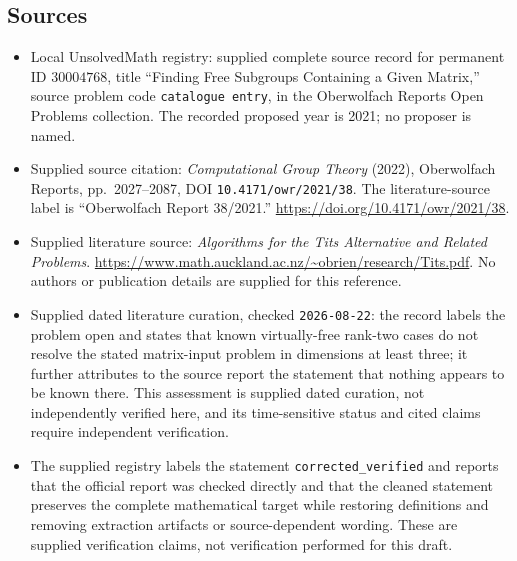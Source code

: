 \documentclass[11pt]{article}
\begin{document}
\subsection{Sources}
\begin{itemize}
\item Local UnsolvedMath registry: supplied complete source record for permanent ID \(30004768\), title ``Finding Free Subgroups Containing a Given Matrix,'' source problem code \texttt{catalogue entry}, in the Oberwolfach Reports Open Problems collection. The recorded proposed year is 2021; no proposer is named.
\item Supplied source citation: \emph{Computational Group Theory} (2022), Oberwolfach Reports, pp.\ 2027--2087, DOI \texttt{10.4171/owr/2021/38}. The literature-source label is ``Oberwolfach Report 38/2021.'' \url{https://doi.org/10.4171/owr/2021/38}.
\item Supplied literature source: \emph{Algorithms for the Tits Alternative and Related Problems}. \url{https://www.math.auckland.ac.nz/~obrien/research/Tits.pdf}. No authors or publication details are supplied for this reference.
\item Supplied dated literature curation, checked \texttt{2026-08-22}: the record labels the problem open and states that known virtually-free rank-two cases do not resolve the stated matrix-input problem in dimensions at least three; it further attributes to the source report the statement that nothing appears to be known there. This assessment is supplied dated curation, not independently verified here, and its time-sensitive status and cited claims require independent verification.
\item The supplied registry labels the statement \texttt{corrected\_verified} and reports that the official report was checked directly and that the cleaned statement preserves the complete mathematical target while restoring definitions and removing extraction artifacts or source-dependent wording. These are supplied verification claims, not verification performed for this draft.
\end{itemize}
\end{document}
